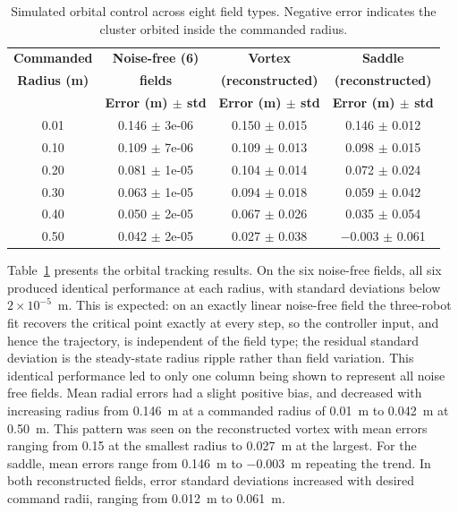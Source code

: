 \documentclass[lettersize,journal]{IEEEtran}
\begin{document}
\begin{table}[!t]
    \centering
    \caption{Simulated orbital control across eight field types. Negative error indicates the cluster orbited inside the commanded radius.}
    \label{tab:simulation_orbital_results}
    \footnotesize
    \setlength{\tabcolsep}{3pt}
    \begin{tabular}{cccc}
    \hline
    \textbf{Commanded} & \textbf{Noise-free (6)} & \textbf{Vortex} & \textbf{Saddle} \\
    \textbf{Radius (m)} & \textbf{fields} & \textbf{(reconstructed)} & \textbf{(reconstructed)} \\
     & \textbf{Error (m) $\pm$ std} & \textbf{Error (m) $\pm$ std} & \textbf{Error (m) $\pm$ std} \\
    \hline
    0.01 & 0.146 $\pm$ 3e-06 & 0.150 $\pm$ 0.015 & 0.146 $\pm$ 0.012 \\
    0.10 & 0.109 $\pm$ 7e-06 & 0.109 $\pm$ 0.013 & 0.098 $\pm$ 0.015 \\
    0.20 & 0.081 $\pm$ 1e-05 & 0.104 $\pm$ 0.014 & 0.072 $\pm$ 0.024 \\
    0.30 & 0.063 $\pm$ 1e-05 & 0.094 $\pm$ 0.018 & 0.059 $\pm$ 0.042 \\
    0.40 & 0.050 $\pm$ 2e-05 & 0.067 $\pm$ 0.026 & 0.035 $\pm$ 0.054 \\
    0.50 & 0.042 $\pm$ 2e-05 & 0.027 $\pm$ 0.038 & $-$0.003 $\pm$ 0.061 \\

    \hline
    \end{tabular}
    \end{table}


    Table~\ref{tab:simulation_orbital_results} presents the orbital tracking results. On the six noise-free fields, all six produced identical performance at each radius, with standard deviations below $2 \times 10^{-5}$~m. This is expected: on an exactly linear noise-free field the three-robot fit recovers the critical point exactly at every step, so the controller input, and hence the trajectory, is independent of the field type; the residual standard deviation is the steady-state radius ripple rather than field variation. This identical performance led to only one column being shown to represent all noise free fields. Mean radial errors had a slight positive bias, and decreased with increasing radius from 0.146~m at a commanded radius of 0.01~m to 0.042~m at 0.50~m. This pattern was seen on the reconstructed vortex with mean errors ranging from 0.15 at the smallest radius to 0.027~m at the largest. For the saddle, mean errors range from 0.146~m to $-0.003$~m repeating the trend. In both reconstructed fields, error standard deviations increased with desired command radii, ranging from 0.012~m to 0.061~m.    
\end{document}
